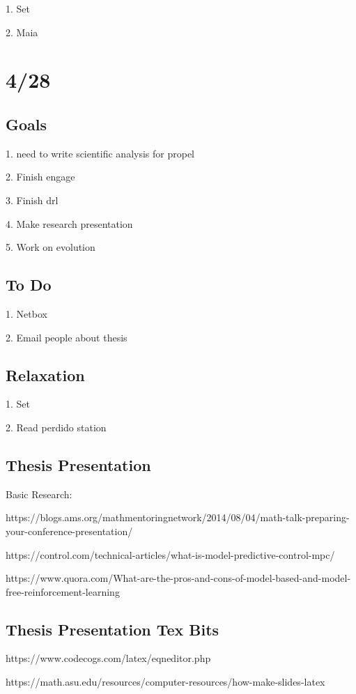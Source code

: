 \documentclass[11pt]{article}
\theoremstyle{remark}
\begin{document}
1. Set

2. Maia

\section{4/28}

\subsection{Goals}

1. need to write scientific analysis for propel

2. Finish engage

3. Finish drl

4. Make research presentation

5. Work on evolution

\subsection{To Do}

1. Netbox

2. Email people about thesis

\subsection{Relaxation}

1. Set

2. Read perdido station

\subsection{Thesis Presentation}

Basic Research:

https://blogs.ams.org/mathmentoringnetwork/2014/08/04/math-talk-preparing-your-conference-presentation/

https://control.com/technical-articles/what-is-model-predictive-control-mpc/

https://www.quora.com/What-are-the-pros-and-cons-of-model-based-and-model-free-reinforcement-learning

\subsection{Thesis Presentation Tex Bits}

https://www.codecogs.com/latex/eqneditor.php

https://math.asu.edu/resources/computer-resources/how-make-slides-latex
\end{document}

